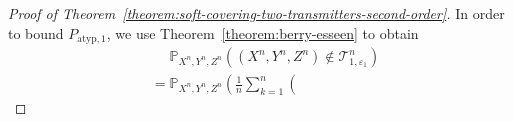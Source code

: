 \documentclass[journal]{IEEEtran}
\newcommand{\channelpmf}{q}
\newcommand{\channelInOne}{X}
\newcommand{\channelInTwo}{Y}
\newcommand{\channelOut}{Z}
\newcommand{\codebookBlocklength}{n}
\newcommand{\blockIndex}{k}
\newcommand{\mutualInformationConditional}[3]{I(#1;#2|#3)}
\newcommand{\Probability}{\mathbb{P}}
\newcommand{\typicalityParam}{\varepsilon}
\newcommand{\typicalSetIndex}[3]{\mathcal{T}_{#3,#1}^{#2}}
\newcommand{\totvarAtypicalOne}{P_{\mathrm{atyp}, 1}}
\begin{document}
\begin{proof}[Proof of Theorem~\ref{theorem:soft-covering-two-transmitters-second-order}]
In order to bound $\totvarAtypicalOne$, we use Theorem~\ref{theorem:berry-esseen} to obtain
\begin{align*}
&\phantom{{}={}}
\Probability_{\channelInOne^\codebookBlocklength, \channelInTwo^\codebookBlocklength, \channelOut^\codebookBlocklength}((\channelInOne^\codebookBlocklength, \channelInTwo^\codebookBlocklength, \channelOut^\codebookBlocklength) \notin \typicalSetIndex{\typicalityParam_1}{\codebookBlocklength}{1})
\\
&
=
\Probability_{\channelInOne^\codebookBlocklength, \channelInTwo^\codebookBlocklength, \channelOut^\codebookBlocklength}\left(
  \frac{1}{\codebookBlocklength}
  \sum\limits_{\blockIndex=1}^\codebookBlocklength
  \left(

\end{align*}
\end{proof}
\end{document}
